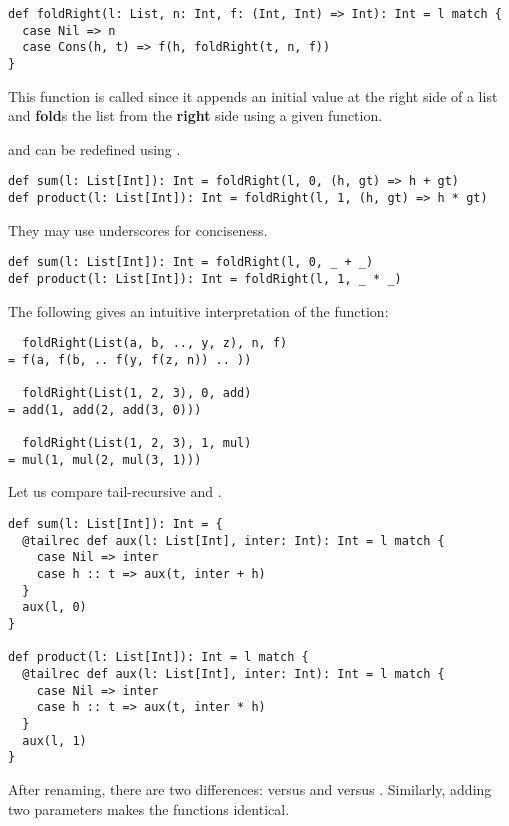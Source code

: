 \begin{verbatim}
def foldRight(l: List, n: Int, f: (Int, Int) => Int): Int = l match {
  case Nil => n
  case Cons(h, t) => f(h, foldRight(t, n, f))
}
\end{verbatim}

This function is called  since it
appends an initial value at the right side of a list and
\textbf{fold}s the list from the \textbf{right} side using a given function.

 and  can be redefined using .

\begin{verbatim}
def sum(l: List[Int]): Int = foldRight(l, 0, (h, gt) => h + gt)
def product(l: List[Int]): Int = foldRight(l, 1, (h, gt) => h * gt)
\end{verbatim}

They may use underscores for conciseness.

\begin{verbatim}
def sum(l: List[Int]): Int = foldRight(l, 0, _ + _)
def product(l: List[Int]): Int = foldRight(l, 1, _ * _)
\end{verbatim}

The following gives an intuitive interpretation of the function:

\begin{verbatim}
  foldRight(List(a, b, .., y, z), n, f)
= f(a, f(b, .. f(y, f(z, n)) .. ))

  foldRight(List(1, 2, 3), 0, add)
= add(1, add(2, add(3, 0)))

  foldRight(List(1, 2, 3), 1, mul)
= mul(1, mul(2, mul(3, 1)))
\end{verbatim}

Let us compare tail-recursive  and .

\begin{verbatim}
def sum(l: List[Int]): Int = {
  @tailrec def aux(l: List[Int], inter: Int): Int = l match {
    case Nil => inter
    case h :: t => aux(t, inter + h)
  }
  aux(l, 0)
}

def product(l: List[Int]): Int = l match {
  @tailrec def aux(l: List[Int], inter: Int): Int = l match {
    case Nil => inter
    case h :: t => aux(t, inter * h)
  }
  aux(l, 1)
}
\end{verbatim}

After renaming, there are two differences:  versus 
and  versus . Similarly, adding two parameters makes the
functions identical.

